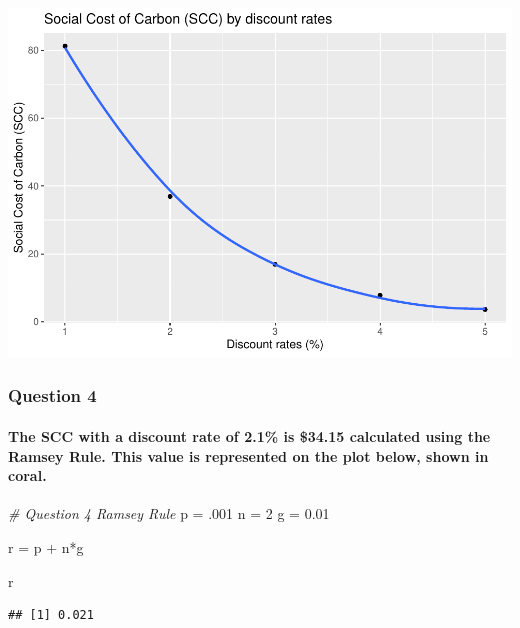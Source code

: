 \documentclass[
]{article}
\newenvironment{Shaded}{\begin{snugshade}}{\end{snugshade}}
\newcommand{\CommentTok}[1]{\textcolor[rgb]{0.56,0.35,0.01}{\textit{#1}}}
\newcommand{\DecValTok}[1]{\textcolor[rgb]{0.00,0.00,0.81}{#1}}
\newcommand{\FloatTok}[1]{\textcolor[rgb]{0.00,0.00,0.81}{#1}}
\newcommand{\NormalTok}[1]{#1}
\newcommand{\OtherTok}[1]{\textcolor[rgb]{0.56,0.35,0.01}{#1}}
\newcommand{\SpecialCharTok}[1]{\textcolor[rgb]{0.00,0.00,0.00}{#1}}
\begin{document}
\includegraphics{Homework-4-Code_files/figure-latex/unnamed-chunk-5-1.pdf}

\hypertarget{question-4}{%
\subsubsection{Question 4}\label{question-4}}

\hypertarget{the-scc-with-a-discount-rate-of-2.1-is-34.15-calculated-using-the-ramsey-rule.-this-value-is-represented-on-the-plot-below-shown-in-coral.}{%
\paragraph{The SCC with a discount rate of 2.1\% is \$34.15 calculated
using the Ramsey Rule. This value is represented on the plot below,
shown in
coral.}\label{the-scc-with-a-discount-rate-of-2.1-is-34.15-calculated-using-the-ramsey-rule.-this-value-is-represented-on-the-plot-below-shown-in-coral.}}

\begin{Shaded}
\begin{Highlighting}[]
\CommentTok{\# Question 4 Ramsey Rule}
\NormalTok{p }\OtherTok{=}\NormalTok{ .}\DecValTok{001}
\NormalTok{n }\OtherTok{=} \DecValTok{2}
\NormalTok{g }\OtherTok{=} \FloatTok{0.01}

\NormalTok{r }\OtherTok{=}\NormalTok{ p }\SpecialCharTok{+}\NormalTok{ n}\SpecialCharTok{*}\NormalTok{g}

\NormalTok{r}
\end{Highlighting}
\end{Shaded}

\begin{verbatim}
## [1] 0.021
\end{verbatim}
\end{document}

